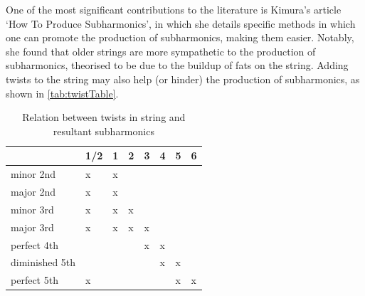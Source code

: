 One of the most significant contributions to the literature is Kimura's article `How To Produce Subharmonics', in which she details specific methods in which one can promote the production of subharmonics, making them easier.\autocite[]{kimuraHowProduceSubharmonics1999}
Notably, she found that older strings are more sympathetic to the production of subharmonics, theorised to be due to the buildup of fats on the string.
Adding twists to the string may also help (or hinder) the production of subharmonics, as shown in \autoref{tab:twistTable}.\autocite[]{kimuraHowProduceSubharmonics1999}

\begin{table}
  \centering
  \caption{Relation between twists in string and resultant subharmonics}
\label{tab:twistTable}
  \begin{tabular}{llllllll} 
  \toprule
  \multicolumn{1}{r}{} & \multicolumn{1}{c}{1/2} & \multicolumn{1}{c}{1} & \multicolumn{1}{c}{2} & \multicolumn{1}{c}{3} & \multicolumn{1}{c}{4} & \multicolumn{1}{c}{5} & \multicolumn{1}{c}{6}  \\ 
  \hline
  minor 2nd            & x                       & x                     &                       &                       &                       &                       &                        \\
  major 2nd            & x                       & x                     &                       &                       &                       &                       &                        \\
  minor 3rd            & x                       & x                     & x                     &                       &                       &                       &                        \\
  major 3rd            & x                       & x                     & x                     & x                     &                       &                       &                        \\
  perfect 4th          &                         &                       &                       & x                     & x                     &                       &                        \\
  diminished 5th       &                         &                       &                       &                       & x                     & x                     &                        \\
  perfect 5th          & x                       &                       &                       &                       &                       & x                     & x                      \\

\end{tabular}
\end{table}
